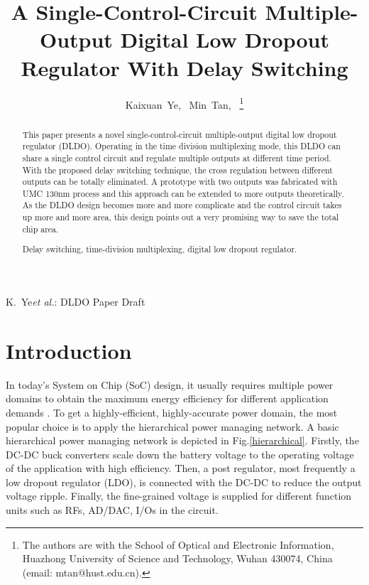 \documentclass[journal]{IEEEtran}
\begin{document}
\title{A Single-Control-Circuit Multiple-Output Digital Low Dropout Regulator With Delay Switching}
\author{
        Kaixuan~Ye,~
        Min~Tan,~%
\thanks{The authors are with the School of Optical and Electronic Information,
Huazhong University of Science and Technology, Wuhan 430074, China (email:
mtan@hust.edu.cn).}
        }

%
{K.~Ye\MakeLowercase{\textit{et al.}}: DLDO Paper Draft}


\maketitle

\begin{abstract}
This paper presents a novel single-control-circuit multiple-output digital low dropout regulator (DLDO). Operating in the time division multiplexing mode, this DLDO can share a single control circuit and regulate multiple outputs at different time period. With the proposed delay switching technique, the cross regulation between different outputs can be totally eliminated. A prototype with two outputs was fabricated with UMC 130nm process and this approach can be extended to more outputs theoretically. As the DLDO design becomes more and more complicate and the control circuit takes up more and more area, this design points out a very promising way to save the total chip area.\\

\begin{IEEEkeywords}
Delay switching, time-division multiplexing, digital low dropout regulator.
\end{IEEEkeywords}
\end{abstract}

\section{Introduction}
In today's System on Chip (SoC) design, it usually requires multiple power domains to obtain the maximum energy efficiency for different application demands \cite{original,AALDO,AALDO1,coarse-fine,pipeline,asynchrounous,recursive}. To get a highly-efficient, highly-accurate power domain, the most popular choice is to apply the hierarchical power managing network. A basic hierarchical power managing network is depicted in Fig.\ref{hierarchical}. Firstly, the DC-DC buck converters scale down the battery voltage to the operating voltage of the application with high efficiency. Then, a post regulator, most frequently a low dropout regulator (LDO), is connected with the DC-DC to reduce the output voltage ripple. Finally, the fine-grained voltage is supplied for different function units such as RFs, AD/DAC, I/Os in the circuit.
\end{document}

